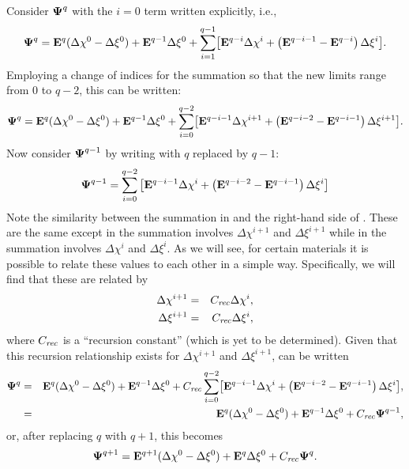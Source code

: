 Consider $\boldsymbol{\Psi}^q$ with the $i=0$ term written explicitly, i.e., 
\begin{equation}
  \boldsymbol{\Psi}^q = \mathbf{E}^{q} (\Delta\chi^{0} - \Delta\xi^{0})
    + \mathbf{E}^{q-1}\Delta\xi^{0} +
  \sum_{i=1}^{q-1}\bigl[
    \mathbf{E}^{q-i} \Delta\chi^{i}
    + \left(\mathbf{E}^{q-i-1}-\mathbf{E}^{q-i}\right)\Delta\xi^{i}\bigr].
\end{equation}
Employing a change of indices for the summation so that the new
limits range from $0$ to $q-2$, this can be written:
\begin{equation}
  \boldsymbol{\Psi}^q = \mathbf{E}^{q} (\Delta\chi^{0} - \Delta\xi^{0})
    + \mathbf{E}^{q-1}\Delta\xi^{0} +
  \sum_{i=0}^{q-2}\bigl[
    \mathbf{E}^{q-i-1} \Delta\chi^{i+1}
    + \left(\mathbf{E}^{q-i-2}-\mathbf{E}^{q-i-1}\right)\Delta\xi^{i+1}\bigr].
  \label{eq:plrcPsiDefI}
\end{equation}
Now consider $\boldsymbol{\Psi}^{q-1}$ by writing  with $q$
replaced by $q-1$:
\begin{equation}
  \boldsymbol{\Psi}^{q-1} = \sum_{i=0}^{q-2}\left[
    \mathbf{E}^{q-i-1} \Delta\chi^{i}
    + \left(\mathbf{E}^{q-i-2}-\mathbf{E}^{q-i-1}\right)\Delta\xi^{i}\right]
  \label{eq:plrcPsiQminusOne}
\end{equation}
Note the similarity between the summation in 
and the right-hand side of .  These are the
same except in  the summation involves
$\Delta\chi^{i+1}$ and $\Delta\xi^{i+1}$ while in
 the summation involves $\Delta\chi^i$
and $\Delta\xi^i$.  As we will see, for certain materials it is
possible to relate these values to each other in a simple way.
Specifically, we will find that these are related by
\begin{eqnarray}
  \Delta\chi^{i+1} &=& C_{\mathit{rec}} \Delta\chi^{i}, 
  \label{eq:CrecDefChi} \\
  \Delta\xi^{i+1} &=& C_{\mathit{rec}} \Delta\xi^{i},
  \label{eq:CrecDefXi}
\end{eqnarray}
where $C_{\mathit{rec}}$ is a ``recursion constant'' (which is yet to be
determined).  Given that this recursion relationship exists for 
$\Delta\chi^{i+1}$ and $\Delta\xi^{i+1}$, 
 can be written
\begin{eqnarray}
  \boldsymbol{\Psi}^q &=& \mathbf{E}^{q} (\Delta\chi^{0} - \Delta\xi^{0})
    + \mathbf{E}^{q-1}\Delta\xi^{0} +
  C_{\mathit{rec}} \sum_{i=0}^{q-2}\bigl[
    \mathbf{E}^{q-i-1} \Delta\chi^{i}
    + \left(\mathbf{E}^{q-i-2}-\mathbf{E}^{q-i-1}\right)\Delta\xi^{i}\bigr], 
  \nonumber\\
  &=& \mathbf{E}^{q} (\Delta\chi^{0} - \Delta\xi^{0})
    + \mathbf{E}^{q-1}\Delta\xi^{0} +
  C_{\mathit{rec}} \boldsymbol{\Psi}^{q-1},
\end{eqnarray}
or, after replacing $q$ with $q+1$, this becomes
\begin{equation}
  \boldsymbol{\Psi}^{q+1} = \mathbf{E}^{q+1} (\Delta\chi^{0} - \Delta\xi^{0})
    + \mathbf{E}^{q}\Delta\xi^{0} + C_{\mathit{rec}} \boldsymbol{\Psi}^q.
    \label{eq:plrcPsiDefII}
\end{equation}

